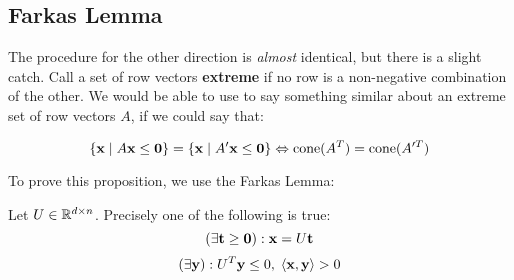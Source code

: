 \subsection{Farkas Lemma}
The procedure for the other direction is \textit{almost} identical, but there is a slight catch.  Call a set of row vectors \textbf{extreme} if no row is a non-negative combination of the other.  We would be able to use  to say something similar about an extreme set of row vectors $A$, if we could say that:

\begin{Thm}\label{dual_cone}
	\[ \left\{\mathbf{x}\;|\; A\mathbf{x}\leq\mathbf{0}\right\} = \left\{\mathbf{x}\;|\; A'\mathbf{x}\leq\mathbf{0}\right\} \Leftrightarrow \operatorname{cone}(A^T) = \operatorname{cone}(A'^T) \]
\end{Thm}

To prove this proposition, we use the Farkas Lemma:

\begin{Prop}\label{farkas_lemma}
	Let $U \in \mathbb{R}^{d\times n}$.  Precisely one of the following is true:
	\[ (\exists \mathbf{t} \geq \mathbf{0}) : \mathbf{x} = U\mathbf{t} \]
	\[ (\exists \mathbf{y}) : U^T\mathbf{y} \leq 0,\; \left\langle \mathbf{x}, \mathbf{y} \right\rangle > 0 \]
\end{Prop}

